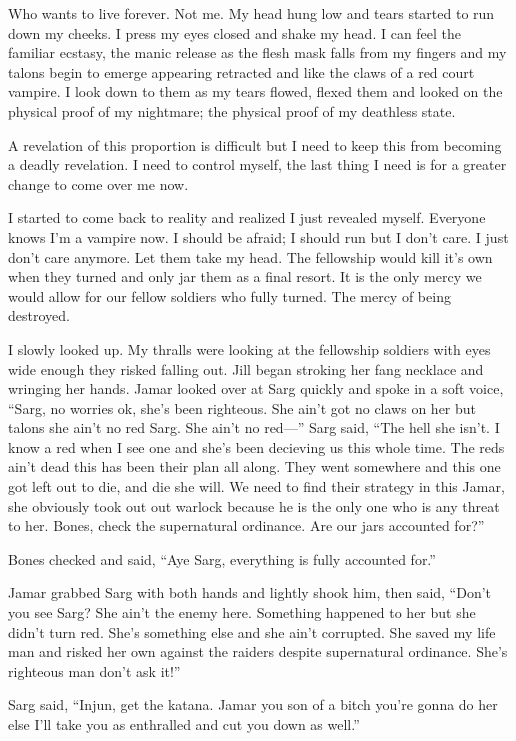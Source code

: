 Who wants to live forever. Not me. My head hung low and tears started to run down my cheeks. I press my eyes closed and shake my head. I can feel the familiar ecstasy, the manic release as the flesh mask falls from my fingers and my talons begin to emerge appearing retracted and like the claws of a red court vampire. I look down to them as my tears flowed, flexed them and looked on the physical proof of my nightmare; the physical proof of my deathless state.

A revelation of this proportion is difficult but I need to keep this from becoming a deadly revelation. I need to control myself, the last thing I need is for a greater change to come over me now.

I started to come back to reality and realized I just revealed myself. Everyone knows I'm a vampire now. I should be afraid; I should run but I don't care. I just don't care anymore. Let them take my head. The fellowship would kill it's own when they turned and only jar them as a final resort. It is the only mercy we would allow for our fellow soldiers who fully turned. The mercy of being destroyed.

I slowly looked up. My thralls were looking at the fellowship soldiers with eyes wide enough they risked falling out. Jill began stroking her fang necklace and wringing her hands. Jamar looked over at Sarg quickly and spoke in a soft voice, ``Sarg, no worries ok, she's been righteous. She ain't got no claws on her but talons she ain't no red Sarg. She ain't no red---'' Sarg said, ``The hell she isn't. I know a red when I see one and she's been decieving us this whole time. The reds ain't dead this has been their plan all along. They went somewhere and this one got left out to die, and die she will. We need to find their strategy in this Jamar, she obviously took out out warlock because he is the only one who is any threat to her. Bones, check the supernatural ordinance. Are our jars accounted for?'' 

Bones checked and said, ``Aye Sarg, everything is fully accounted for.'' 

Jamar grabbed Sarg with both hands and lightly shook him, then said, ``Don't you see Sarg? She ain't the enemy here. Something happened to her but she didn't turn red. She's something else and she ain't corrupted. She saved my life man and risked her own against the raiders despite supernatural ordinance. She's righteous man don't ask it!''

Sarg said, ``Injun, get the katana. Jamar you son of a bitch you're gonna do her else I'll take you as enthralled and cut you down as well.'' 

